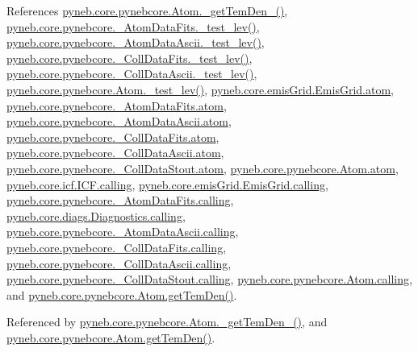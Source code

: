 References \hyperlink{pynebcore_8py_source_l01869}{pyneb.\-core.\-pynebcore.\-Atom.\-\_\-get\-Tem\-Den\-\_()}, \hyperlink{pynebcore_8py_source_l00178}{pyneb.\-core.\-pynebcore.\-\_\-\-Atom\-Data\-Fits.\-\_\-test\-\_\-lev()}, \hyperlink{pynebcore_8py_source_l00447}{pyneb.\-core.\-pynebcore.\-\_\-\-Atom\-Data\-Ascii.\-\_\-test\-\_\-lev()}, \hyperlink{pynebcore_8py_source_l00677}{pyneb.\-core.\-pynebcore.\-\_\-\-Coll\-Data\-Fits.\-\_\-test\-\_\-lev()}, \hyperlink{pynebcore_8py_source_l01045}{pyneb.\-core.\-pynebcore.\-\_\-\-Coll\-Data\-Ascii.\-\_\-test\-\_\-lev()}, \hyperlink{pynebcore_8py_source_l01525}{pyneb.\-core.\-pynebcore.\-Atom.\-\_\-test\-\_\-lev()}, \hyperlink{emis_grid_8py_source_l00051}{pyneb.\-core.\-emis\-Grid.\-Emis\-Grid.\-atom}, \hyperlink{pynebcore_8py_source_l00089}{pyneb.\-core.\-pynebcore.\-\_\-\-Atom\-Data\-Fits.\-atom}, \hyperlink{pynebcore_8py_source_l00310}{pyneb.\-core.\-pynebcore.\-\_\-\-Atom\-Data\-Ascii.\-atom}, \hyperlink{pynebcore_8py_source_l00576}{pyneb.\-core.\-pynebcore.\-\_\-\-Coll\-Data\-Fits.\-atom}, \hyperlink{pynebcore_8py_source_l00926}{pyneb.\-core.\-pynebcore.\-\_\-\-Coll\-Data\-Ascii.\-atom}, \hyperlink{pynebcore_8py_source_l01162}{pyneb.\-core.\-pynebcore.\-\_\-\-Coll\-Data\-Stout.\-atom}, \hyperlink{pynebcore_8py_source_l01218}{pyneb.\-core.\-pynebcore.\-Atom.\-atom}, \hyperlink{icf_8py_source_l00016}{pyneb.\-core.\-icf.\-I\-C\-F.\-calling}, \hyperlink{emis_grid_8py_source_l00044}{pyneb.\-core.\-emis\-Grid.\-Emis\-Grid.\-calling}, \hyperlink{pynebcore_8py_source_l00097}{pyneb.\-core.\-pynebcore.\-\_\-\-Atom\-Data\-Fits.\-calling}, \hyperlink{diags_8py_source_l00169}{pyneb.\-core.\-diags.\-Diagnostics.\-calling}, \hyperlink{pynebcore_8py_source_l00318}{pyneb.\-core.\-pynebcore.\-\_\-\-Atom\-Data\-Ascii.\-calling}, \hyperlink{pynebcore_8py_source_l00585}{pyneb.\-core.\-pynebcore.\-\_\-\-Coll\-Data\-Fits.\-calling}, \hyperlink{pynebcore_8py_source_l00936}{pyneb.\-core.\-pynebcore.\-\_\-\-Coll\-Data\-Ascii.\-calling}, \hyperlink{pynebcore_8py_source_l01156}{pyneb.\-core.\-pynebcore.\-\_\-\-Coll\-Data\-Stout.\-calling}, \hyperlink{pynebcore_8py_source_l01229}{pyneb.\-core.\-pynebcore.\-Atom.\-calling}, and \hyperlink{pynebcore_8py_source_l02126}{pyneb.\-core.\-pynebcore.\-Atom.\-get\-Tem\-Den()}.



Referenced by \hyperlink{pynebcore_8py_source_l01869}{pyneb.\-core.\-pynebcore.\-Atom.\-\_\-get\-Tem\-Den\-\_()}, and \hyperlink{pynebcore_8py_source_l02126}{pyneb.\-core.\-pynebcore.\-Atom.\-get\-Tem\-Den()}.


